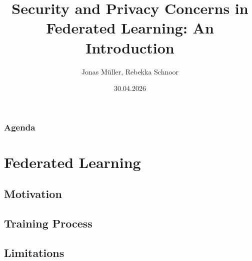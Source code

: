 \documentclass[t,aspectratio=169]{beamer}
\title{Security and Privacy Concerns in Federated Learning: An Introduction}
\author[]{Jonas Müller, Rebekka Schnoor}
\date{30.04.2026} %
\begin{document}
\begin{frame}
	\maketitle
\end{frame}

\begin{frame}
	\frametitle{Agenda}
	\tableofcontents
\end{frame}

\section{Federated Learning} %
\subsection{Motivation} %
\subsection{Training Process}
\subsection{Limitations} %
\end{document}
